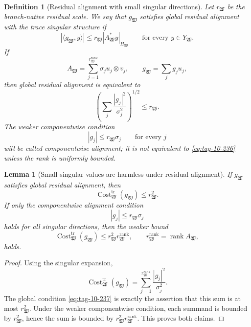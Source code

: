 \documentclass[11pt]{article}
\numberwithin{equation}{section}
\newtheorem{lemma}[theorem]{Lemma}
\newtheorem{definition}[theorem]{Definition}
\begin{document}
\begin{definition}[Residual alignment with small singular directions]
Let \(r_{\mathfrak W}\) be the branch-native residual scale. We say that \(g_{\mathfrak W}\) satisfies \emph{global residual alignment} with the trace singular structure if
\begin{equation}
|\langle g_{\mathfrak W},y\rangle|
\le
r_{\mathfrak W}|A_{\mathfrak W}^*y|_{H_{\mathfrak W}}
\qquad
\text{for every }y\in Y_{\mathfrak W}.
\label{eq:tag-10-236}
\end{equation}
If
\[
A_{\mathfrak W}=\sum_{j=1}^{r_{\mathfrak W}^{\operatorname{rank}}}\sigma_j u_j\otimes v_j,
\qquad
 g_{\mathfrak W}=\sum_j g_j u_j,
\]
then global residual alignment is equivalent to
\begin{equation}
\left(\sum_j\frac{|g_j|^2}{\sigma_j^2}\right)^{1/2}
\le r_{\mathfrak W}.
\label{eq:tag-10-237}
\end{equation}
The weaker componentwise condition
\[
|g_j|\le r_{\mathfrak W}\sigma_j
\qquad\text{for every }j
\]
will be called \emph{componentwise alignment}; it is not equivalent to \eqref{eq:tag-10-236} unless the rank is uniformly bounded.
\end{definition}

\begin{lemma}[Small singular values are harmless under residual alignment]\label{lem:singular-values-harmless-corrected}
If \(g_{\mathfrak W}\) satisfies global residual alignment, then
\[
\operatorname{Cost}^{\operatorname{tr}}_{\mathfrak W}(g_{\mathfrak W})
\le
r_{\mathfrak W}^2.
\]
If only the componentwise alignment condition
\[
|g_j|\le r_{\mathfrak W}\sigma_j
\]
holds for all singular directions, then the weaker bound
\[
\operatorname{Cost}^{\operatorname{tr}}_{\mathfrak W}(g_{\mathfrak W})
\le
r_{\mathfrak W}^2 r_{\mathfrak W}^{\operatorname{rank}},
\qquad
r_{\mathfrak W}^{\operatorname{rank}}=\operatorname{rank}A_{\mathfrak W},
\]
holds.
\end{lemma}

\begin{proof}
Using the singular expansion,
\[
\operatorname{Cost}^{\operatorname{tr}}_{\mathfrak W}(g_{\mathfrak W}) =
\sum_{j=1}^{r_{\mathfrak W}^{\operatorname{rank}}}
\frac{|g_j|^2}{\sigma_j^2}.
\]
The global condition \eqref{eq:tag-10-237} is exactly the assertion that this sum is at most \(r_{\mathfrak W}^2\).  Under the weaker componentwise condition, each summand is bounded by \(r_{\mathfrak W}^2\), hence the sum is bounded by \(r_{\mathfrak W}^2 r_{\mathfrak W}^{\operatorname{rank}}\).  This proves both claims.
\end{proof}
\end{document}
